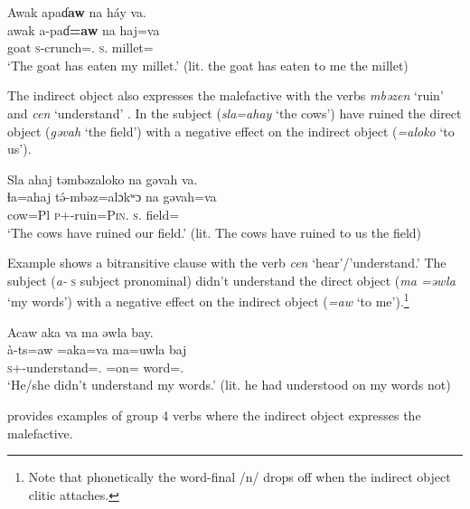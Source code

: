 \ea \label{ex:9:20}
Awak  apaɗ\textbf{aw}   na  háy  va.\\
\gll  awak a-paɗ\textbf{=aw}    na   haj=va\\
      goat    \textsc{s}-crunch={\oneS}.{\IO}   \textsc{s}.{\DO}   millet={\PRF}\\
\glt  ‘The goat has eaten my millet.’ (lit. the goat has eaten to me the millet) 
\z

The indirect object also expresses the malefactive with the verbs \textit{mbəzen} ‘ruin’  and \textit{cen} ‘understand’ . In  the subject (\textit{sla=ahay }‘the cows’) have ruined the direct object (\textit{gəvah} ‘the field’) with a negative effect on the indirect object (\textit{=aloko} ‘to us’).

\ea \label{ex:9:21}
Sla  ahaj  təmbəzaloko  na  gəvah  va.\\
\gll  ɬa=ahaj   t\'{ə}-mbəz=alɔkʷɔ        na     gəvah=va\\
      cow=Pl       \textsc{p}+{\PFV}-ruin=\textsc{Pin}.{\IO}  \textsc{s}.{\DO}  \textit{   }field={\PRF}\\
\glt  ‘The cows have ruined our field.’ (lit. The cows have ruined to us the field)
\z

Example  shows a bitransitive clause with the verb \textit{cen} ‘hear’/'understand.' The subject (\textit{a-} \textsc{s} subject pronominal) didn’t understand the direct object (\textit{ma =əwla} ‘my words’) with a negative effect on the indirect object (\textit{=aw} ‘to me’).\footnote{Note that phonetically the word-final /n/ drops off when the indirect object clitic attaches.} 

\ea \label{ex:9:22}
Acaw  aka  va  ma  əwla  bay.\\
\gll  à-ts=aw     =aka=va     ma=uwla      baj\\
      \textsc{s}+{\PFV}-understand={\oneS}.{\IO}  =on={\PRF}  word={\oneS}.{\POSS}  {\NEG}\\
\glt  ‘He/she didn’t understand my words.’ (lit. he had understood on my words not)
\z

 provides examples of group 4 verbs where the indirect object expresses the malefactive.

